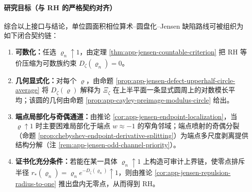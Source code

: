 \paragraph{研究目标（与 RH 的严格契约对齐）}\label{par:app-jensen-research-target-chain}
综合以上接口与结论，单位圆面积相位算术--圆盘化--Jensen 缺陷路线可被组织为如下闭合契约链：
\begin{enumerate}
  \item \textbf{可数化：}任选 \(\varrho_n\uparrow 1\)，由定理 \ref{thm:app-jensen-countable-criterion} 把 RH 等价压缩为可数族约束 \(D_{\zeta}(\varrho_n)=0\)。
  \item \textbf{几何显式化：}对每个 \(\varrho\)，由命题 \ref{prop:app-jensen-defect-upperhalf-circle-average} 将 \(D_{\zeta}(\varrho)\) 解释为 \(\Xi_{\zeta}\) 在上半平面一条显式圆周上的对数模长平均；该圆的几何由命题 \ref{prop:app-cayley-preimage-modulus-circle} 给出。
  \item \textbf{端点局部化与奇偶通道：}由推论 \ref{cor:app-jensen-endpoint-localization}，当 \(\varrho\uparrow 1\) 时主要困难局部化于端点 \(w\approx-1\) 的窄角邻域；端点喷射的奇偶分裂（命题 \ref{prop:chebyshev-endpoint-derivative-splitting}）为端点多尺度剥离提供结构分解（注 \ref{rem:app-jensen-odd-channel-priority}）。
  \item \textbf{证书化充分条件：}若能在某一具体 \(\varrho_n\uparrow 1\) 上构造可审计上界链，使零点排斥半径 \(r_{\ast}(\varrho_n)=\varrho_n e^{-D_{\zeta}(\varrho_n)}\uparrow 1\)，则由推论 \ref{cor:app-jensen-repulsion-radius-to-one} 推出盘内无零点，从而得到 RH。
\end{enumerate}

